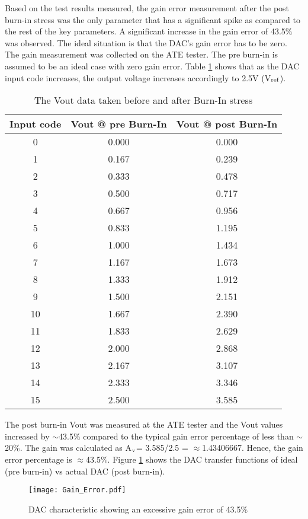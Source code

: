 \documentclass[11pt,a4paper]{article}
\begin{document}
Based on the test results measured, the gain error measurement after the post burn-in stress was the only parameter that has a significant spike as compared to the rest of the key parameters. A significant increase in the gain error of 43.5$\%$ was observed. The ideal situation is that the DAC's gain error has to be zero. The gain measurement was collected on the ATE tester. The pre burn-in is assumed to be an ideal case with zero gain error. Table \ref{table4} shows that as the DAC input code increases, the output voltage increases accordingly to 2.5V (V$_{\rm ref}$). 

\begin{table}[t]
\centering
\caption{The Vout data taken before and after Burn-In stress}
\label{table4}
\begin{tabular}{|c|c|c|}\hline
Input code&Vout @ pre Burn-In&Vout @ post Burn-In\\
\hline
0&0.000&0.000\\
1&0.167&0.239\\
2&0.333&0.478\\
3&0.500&0.717\\
4&0.667&0.956\\
5&0.833&1.195\\
6&1.000&1.434\\
7&1.167&1.673\\
8&1.333&1.912\\
9&1.500&2.151\\
10&1.667&2.390\\
11&1.833&2.629\\
12&2.000&2.868\\
13&2.167&3.107\\
14&2.333&3.346\\
15&2.500&3.585\\
\hline
\end{tabular}


\end{table}

The post burn-in Vout was measured at the ATE tester and the Vout values increased by $\sim$43.5$\%$ compared to the typical gain error percentage of less than $\sim$20$\%$. The gain was calculated as A$_{\rm v}$= 3.585/2.5 = $\approx$1.43406667. Hence, the gain error percentage is $\approx$43.5$\%$.
Figure \ref{figure66} shows the DAC transfer functions of ideal (pre burn-in) vs actual DAC (post burn-in). 

\begin{figure}[t]
\centering
\texttt{[image: Gain\_Error.pdf]}
\caption{DAC characteristic showing an excessive gain error of 43.5$\%$}
\label{figure66}
\end{figure}
\end{document}
